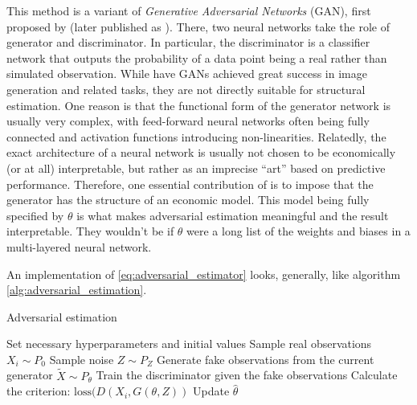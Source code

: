 This method is a variant of \textit{Generative Adversarial Networks} (GAN), first proposed by \textcite{goodfellow2014generative} (later published as \textcite{goodfellow2020generative}).
There, two neural networks take the role of generator and discriminator. %
In particular, the discriminator is a classifier network that outputs the probability of a data point being a real rather than simulated observation.
While have GANs achieved great success in image generation and related tasks, %
they are not directly suitable for structural estimation.
One reason is that the functional form of the generator network is usually very complex, with feed-forward neural networks often being fully connected and activation functions introducing non-linearities.
Relatedly, the exact architecture of a neural network is usually not chosen to be economically (or at all) interpretable, but rather as an imprecise ``art'' based on predictive performance.
Therefore, one essential contribution of \textcite{kaji2023adversarial} is to impose that the generator has the structure of an economic model.
This model being fully specified by $\theta$ is what makes adversarial estimation meaningful and the result interpretable.
They wouldn't be if $\theta$ were a long list of the weights and biases in a multi-layered neural network.

An implementation of \ref{eq:adversarial_estimator} looks, generally, like algorithm \ref{alg:adversarial_estimation}.

\begin{algorithm}
    \caption{Adversarial estimation}
    \label{alg:adversarial_estimation}
    \begin{algorithmic}[1]
        \STATE Set necessary hyperparameters and initial values
        \STATE Sample real observations $X_i \sim P_0$
        \STATE Sample noise $Z \sim P_Z$
            \STATE Generate fake observations from the current generator $\widetilde{X} \sim P_{\theta}$ 
                \STATE Train the discriminator given the fake observations
            \ENDIF
            \STATE Calculate the criterion: $\text{loss}(D(X_i, G(\theta, Z))$
            \STATE Update $\hat{\theta}$ %
        \ENDWHILE
    \end{algorithmic}
\end{algorithm}

